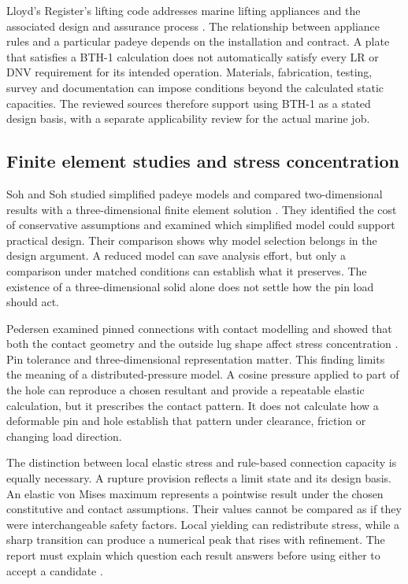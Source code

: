 Lloyd's Register's lifting code addresses marine lifting appliances and the associated design and assurance process \cite{lrLifting2026}. The relationship between appliance rules and a particular padeye depends on the installation and contract. A plate that satisfies a BTH-1 calculation does not automatically satisfy every LR or DNV requirement for its intended operation. Materials, fabrication, testing, survey and documentation can impose conditions beyond the calculated static capacities. The reviewed sources therefore support using BTH-1 as a stated design basis, with a separate applicability review for the actual marine job.

\subsection{Finite element studies and stress concentration}
\label{sec:lit-lug-fea}

Soh and Soh studied simplified padeye models and compared two-dimensional results with a three-dimensional finite element solution \cite{soh1989}. They identified the cost of conservative assumptions and examined which simplified model could support practical design. Their comparison shows why model selection belongs in the design argument. A reduced model can save analysis effort, but only a comparison under matched conditions can establish what it preserves. The existence of a three-dimensional solid alone does not settle how the pin load should act.

Pedersen examined pinned connections with contact modelling and showed that both the contact geometry and the outside lug shape affect stress concentration \cite{pedersen2019}. Pin tolerance and three-dimensional representation matter. This finding limits the meaning of a distributed-pressure model. A cosine pressure applied to part of the hole can reproduce a chosen resultant and provide a repeatable elastic calculation, but it prescribes the contact pattern. It does not calculate how a deformable pin and hole establish that pattern under clearance, friction or changing load direction.

The distinction between local elastic stress and rule-based connection capacity is equally necessary. A rupture provision reflects a limit state and its design basis. An elastic von Mises maximum represents a pointwise result under the chosen constitutive and contact assumptions. Their values cannot be compared as if they were interchangeable safety factors. Local yielding can redistribute stress, while a sharp transition can produce a numerical peak that rises with refinement. The report must explain which question each result answers before using either to accept a candidate \cite{duerr2006,pedersen2019,asmeVV10}.

